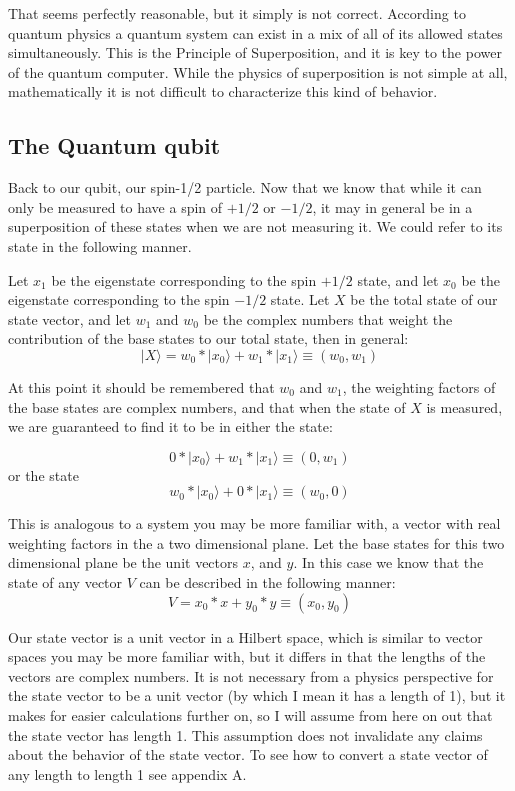 \documentclass[]{article}
\begin{document}
That seems perfectly reasonable, but it simply is not correct.
According to quantum physics a quantum system can exist in a mix of
all of its allowed states simultaneously.  This is the Principle of
Superposition, and it is key to the power of the quantum computer.
While the physics of superposition is not simple at all,
mathematically it is not difficult to characterize this kind of
behavior.

\subsection{The Quantum qubit}

Back to our qubit, our spin-1/2 particle.  Now that we know that while
it can only be measured to have a spin of $+1/2$ or $-1/2$, it may in
general be in a superposition of these states when we are not
measuring it.  We could refer to its state in the following manner.

Let $x_{1}$ be the eigenstate corresponding to the spin $+1/2$ state,
and let $x_{0}$ be the eigenstate corresponding to the spin $-1/2$
state.  Let $X$ be the total state of our state vector, and let
$w_{1}$ and $w_{0}$ be the complex numbers that weight the
contribution of the base states to our total state, then in general:
	\[|X \rangle = w_{0} * |x_{0} \rangle + w_{1} * |x_{1} \rangle \equiv (w_{0},w_{1})\]

At this point it should be remembered that $w_{0}$ and $w_{1}$, the
weighting factors of the base states are complex numbers, and that
when the state of $X$ is measured, we are guaranteed to find it to be
in either the state:

	\[0 * |x_{0} \rangle + w_{1} * |x_{1} \rangle \equiv (0,w_{1})\] or the state
	\[w_{0} * |x_{0} \rangle + 0 * |x_{1} \rangle \equiv (w_{0},0)\]

This is analogous to a system you may be more familiar with, a vector
with real weighting factors in the a two dimensional plane.  Let the
base states for this two dimensional plane be the unit vectors $x$,
and $y$.  In this case we know that the state of any vector $V$ can be
described in the following manner:
	\[V = x_{0} * x + y_{0} * y \equiv (x_{0},y_{0})\]

Our state vector is a unit vector in a Hilbert space, which is similar
to vector spaces you may be more familiar with, but it differs in that
the lengths of the vectors are complex numbers.  It is not necessary
from a physics perspective for the state vector to be a unit vector
(by which I mean it has a length of 1), but it makes for easier
calculations further on, so I will assume from here on out that the
state vector has length 1.  This assumption does not invalidate any
claims about the behavior of the state vector.  To see how to convert
a state vector of any length to length 1 see appendix A.
\end{document}
